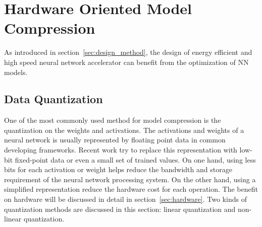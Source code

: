 \section{Hardware Oriented Model Compression}\label{sec:software}

As introduced in section~\ref{sec:design_method}, the design of energy efficient and high speed neural network accelerator can benefit from the optimization of NN models. 

\subsection{Data Quantization}\label{sec:software:quant}
One of the most commonly used method for model compression is the quantization on the weights and activations. The activations and weights of a neural network is usually represented by floating point data in common developing frameworks. Recent work try to replace this representation with low-bit fixed-point data or even a small set of trained values. On one hand, using less bits for each activation or weight helps reduce the bandwidth and storage requirement of the neural network processing system. On the other hand, using a simplified representation reduce the hardware cost for each operation. The benefit on hardware will be discussed in detail in section~\ref{sec:hardware}. Two kinds of quantization methods are discussed in this section: linear quantization and non-linear quantization.

